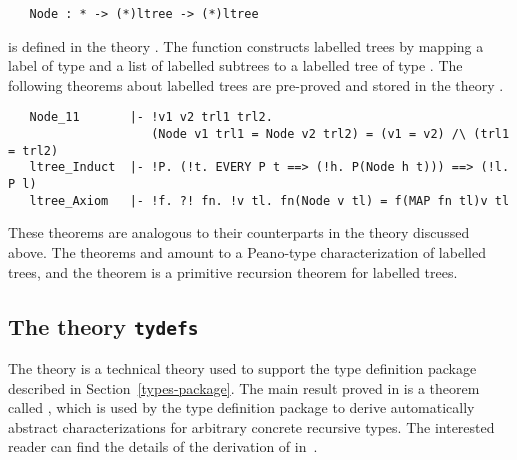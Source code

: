 \begin{hol}
\begin{verbatim}
   Node : * -> (*)ltree -> (*)ltree
\end{verbatim}\end{hol}

\noindent is defined in the theory .  The function 
constructs labelled trees by mapping a label of type \ml{*} and a list of
labelled subtrees to a labelled tree of type .
The following theorems
 about labelled trees are pre-proved and stored in the
theory .


\begin{hol}
\begin{verbatim}
   Node_11       |- !v1 v2 trl1 trl2.
                    (Node v1 trl1 = Node v2 trl2) = (v1 = v2) /\ (trl1 = trl2)
   ltree_Induct  |- !P. (!t. EVERY P t ==> (!h. P(Node h t))) ==> (!l. P l)
   ltree_Axiom   |- !f. ?! fn. !v tl. fn(Node v tl) = f(MAP fn tl)v tl
\end{verbatim}\end{hol}

\noindent These  theorems  are  analogous to  their counterparts  in the theory
 discussed  above.    The theorems  
and  amount to a Peano-type characterization of labelled
trees, and the theorem  is a primitive recursion theorem for
labelled trees.

\subsection{The theory {\tt tydefs}}

The theory 
 is a  technical theory used
to support the type definition package described in
Section~\ref{types-package}.  The main result proved in  is a
theorem called ,
 which is used by the type definition package
to derive automatically abstract characterizations for
arbitrary concrete recursive types.  The interested reader can find the
details of the derivation of  in~\cite{Melham-banff}.

